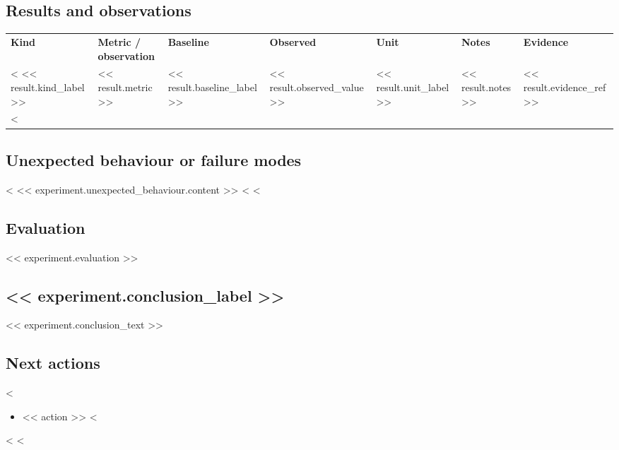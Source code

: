 \documentclass[11pt]{article}
\begin{document}
\subsection{Results and observations}
\small
{}
\begin{xltabular}{\textwidth}{@{}L{1.6cm}L{2.3cm}L{1.5cm}L{1.5cm}L{1.3cm}Y L{1.5cm}@{}}
\textbf{Kind} & \textbf{Metric / observation} & \textbf{Baseline} & \textbf{Observed} & \textbf{Unit} & \textbf{Notes} & \textbf{Evidence} \\
<%
<< result.kind_label >> & << result.metric >> & << result.baseline_label >> & << result.observed_value >> & << result.unit_label >> & << result.notes >> & << result.evidence_ref >> \\
<%
\end{xltabular}
\normalsize

\subsection{Unexpected behaviour or failure modes}
<%
<< experiment.unexpected_behaviour.content >>
<%
\RDNoData
<%

\subsection{Evaluation}
<< experiment.evaluation >>

\subsection{<< experiment.conclusion_label >>}
<< experiment.conclusion_text >>

\subsection{Next actions}
<%
\begin{itemize}
<%
\item << action >>
<%
\end{itemize}
<%
\RDNoData
<%

\end{document}
